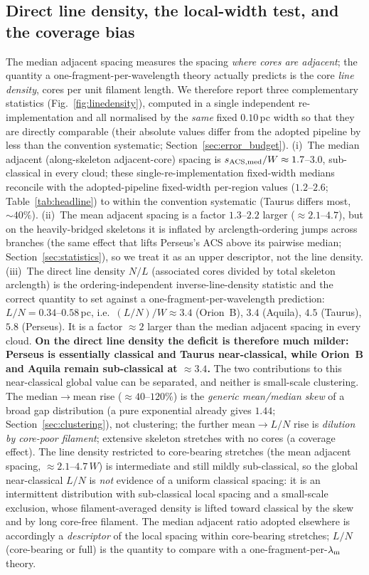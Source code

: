 \documentclass[usenatbib,twoside,twocolumn]{mnras}
\begin{document}
\subsection{Direct line density, the local-width test, and the coverage bias}
\label{sec:linedensity}
The median adjacent spacing measures the spacing \emph{where cores are adjacent}; the quantity a one-fragment-per-wavelength theory actually predicts is the core \emph{line density}, cores per unit filament length. We therefore report three complementary statistics (Fig.~\ref{fig:linedensity}), computed in a single independent re-implementation and all normalised by the \emph{same} fixed $0.10$\,pc width so that they are directly comparable (their absolute values differ from the adopted pipeline by less than the convention systematic; Section~\ref{sec:error_budget}). (i)~The median adjacent (along-skeleton adjacent-core) spacing is $s_{\rm ACS,med}/W\approx1.7$--$3.0$, sub-classical in every cloud; these single-re-implementation fixed-width medians reconcile with the adopted-pipeline fixed-width per-region values ($1.2$--$2.6$; Table~\ref{tab:headline}) to within the convention systematic (Taurus differs most, $\sim40\%$). (ii)~The mean adjacent spacing is a factor $1.3$--$2.2$ larger ($\approx2.1$--$4.7$), but on the heavily-bridged skeletons it is inflated by arclength-ordering jumps across branches (the same effect that lifts Perseus's ACS above its pairwise median; Section~\ref{sec:statistics}), so we treat it as an upper descriptor, not the line density. (iii)~The direct line density $N/L$ (associated cores divided by total skeleton arclength) is the ordering-independent inverse-line-density statistic and the correct quantity to set against a one-fragment-per-wavelength prediction: $L/N=0.34$--$0.58$\,pc, i.e.\ $(L/N)/W\approx3.4$ (Orion~B), $3.4$ (Aquila), $4.5$ (Taurus), $5.8$ (Perseus). It is a factor $\approx2$ larger than the median adjacent spacing in every cloud. \textbf{On the direct line density the deficit is therefore much milder: Perseus is essentially classical and Taurus near-classical, while Orion~B and Aquila remain sub-classical at $\approx3.4$.} The two contributions to this near-classical global value can be separated, and neither is small-scale clustering. The median$\to$mean rise ($\approx40$--$120\%$) is the \emph{generic mean/median skew} of a broad gap distribution (a pure exponential already gives $1.44$; Section~\ref{sec:clustering}), not clustering; the further mean$\to L/N$ rise is \emph{dilution by core-poor filament}; extensive skeleton stretches with no cores (a coverage effect). The line density restricted to core-bearing stretches (the mean adjacent spacing, $\approx2.1$--$4.7\,W$) is intermediate and still mildly sub-classical, so the global near-classical $L/N$ is \emph{not} evidence of a uniform classical spacing: it is an intermittent distribution with sub-classical local spacing and a small-scale exclusion, whose filament-averaged density is lifted toward classical by the skew and by long core-free filament. The median adjacent ratio adopted elsewhere is accordingly a \emph{descriptor} of the local spacing within core-bearing stretches; $L/N$ (core-bearing or full) is the quantity to compare with a one-fragment-per-$\lambda_{\rm m}$ theory.
\end{document}
